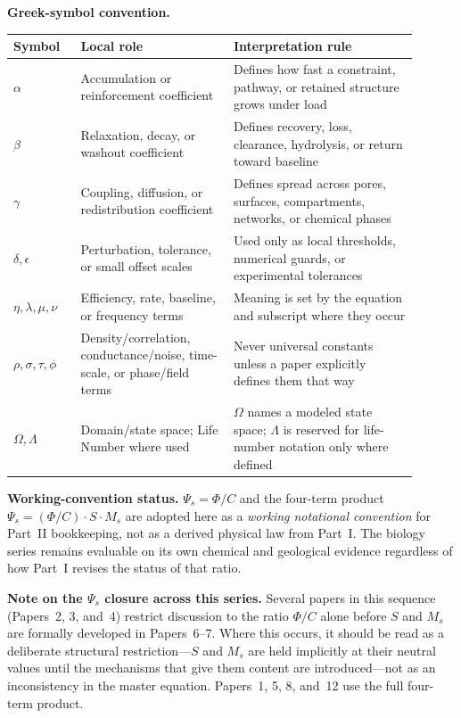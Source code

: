 \documentclass[11pt,a4paper]{article}
\begin{document}
\noindent\textbf{Greek-symbol convention.}
\begin{center}
{\small
\begin{tabular}{p{0.15\linewidth}p{0.34\linewidth}p{0.41\linewidth}}
\toprule
Symbol & Local role & Interpretation rule \\
\midrule
$\alpha$ & Accumulation or reinforcement coefficient & Defines how fast a constraint, pathway, or retained structure grows under load \\
$\beta$ & Relaxation, decay, or washout coefficient & Defines recovery, loss, clearance, hydrolysis, or return toward baseline \\
$\gamma$ & Coupling, diffusion, or redistribution coefficient & Defines spread across pores, surfaces, compartments, networks, or chemical phases \\
$\delta,\epsilon$ & Perturbation, tolerance, or small offset scales & Used only as local thresholds, numerical guards, or experimental tolerances \\
$\eta,\lambda,\mu,\nu$ & Efficiency, rate, baseline, or frequency terms & Meaning is set by the equation and subscript where they occur \\
$\rho,\sigma,\tau,\phi$ & Density/correlation, conductance/noise, time-scale, or phase/field terms & Never universal constants unless a paper explicitly defines them that way \\
$\Omega,\Lambda$ & Domain/state space; Life Number where used & $\Omega$ names a modeled state space; $\Lambda$ is reserved for life-number notation only where defined \\
\bottomrule
\end{tabular}
}
\end{center}

\noindent\textbf{Working-convention status.}
$\Psi_s=\Phi/C$ and the four-term product $\Psi_s=(\Phi/C)\cdot S\cdot M_s$ are adopted here as a \emph{working notational convention} for Part~II bookkeeping, not as a derived physical law from Part~I. The biology series remains evaluable on its own chemical and geological evidence regardless of how Part~I revises the status of that ratio.

\noindent\textbf{Note on the $\Psi_s$ closure across this series.}
Several papers in this sequence (Papers~2, 3, and~4) restrict discussion to the ratio $\Phi/C$ alone before $S$ and $M_s$ are formally developed in Papers~6--7. Where this occurs, it should be read as a deliberate structural restriction---$S$ and $M_s$ are held implicitly at their neutral values until the mechanisms that give them content are introduced---not as an inconsistency in the master equation. Papers~1, 5, 8, and~12 use the full four-term product.
\end{document}
